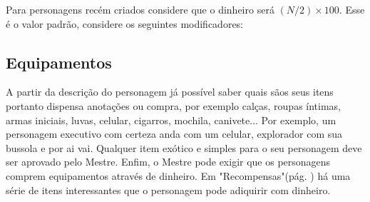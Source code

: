 Para personagens recém criados considere que o dinheiro será \( (N/2) \times 100 \). Esse é o valor padrão, considere os seguintes modificadores:

\subsection{Equipamentos}
A partir da descrição do personagem já possível saber quais sãos seus itens portanto dispensa anotações ou compra, por exemplo calças, roupas íntimas, armas iniciais, luvas, celular, cigarros, mochila, canivete... Por exemplo, um personagem executivo com certeza anda com um celular, explorador com sua bussola e por ai vai. Qualquer item exótico e simples para o seu personagem deve ser aprovado pelo Mestre. Enfim, o Mestre pode exigir que os personagens comprem equipamentos através de dinheiro. Em "Recompensas"(pág. \pageref{ch:reward}) há uma série de itens interessantes que o personagem pode adiquirir com dinheiro.

